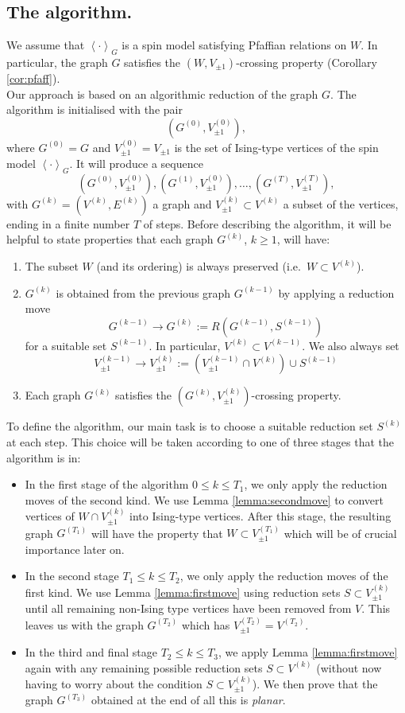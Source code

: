 \documentclass{article}
\numberwithin{equation}{section}
\theoremstyle{definition}
\theoremstyle{definition}
\theoremstyle{remark}
\newcommand{\Vis}{V_{\mathrm{Ising}}}
\renewcommand{\Vis}{V_{\pm 1}}
\renewcommand{\k}[1]{{#1}^{(k)}}
\begin{document}
\subsection{The algorithm. }
We assume that $\left< \cdot \right>_{G}$ is a spin model satisfying Pfaffian relations on $W$. In particular, the graph $G$ satisfies the $(W,\Vis)$-crossing property (Corollary \ref{cor:pfaff}).
\\[1em]
\noindent Our approach is based on an algorithmic reduction of the graph $G$. 
The algorithm is initialised with the pair
\[
	(G^{(0)},\Vis^{(0)}),
\]
where $G^{(0)} = G$ and $\Vis^{(0)} = \Vis$ is the set of Ising-type vertices of the spin model $\left< \cdot \right>_{G}$. 
It will produce a sequence
\[
	(G^{(0)},\Vis^{(0)}),(G^{(1)},\Vis^{(0)}), \ldots, (G^{(T)},\Vis^{(T)}),
\]
with $\k{G} = (\k{V},\k{E})$ a graph and $\Vis^{(k)} \subset \k{V}$ a subset of the vertices, ending in a finite number $T$ of steps. Before describing the algorithm, it will be helpful to state properties that each graph $G^{(k)}$, $k \geq 1$, will have:
\begin{enumerate}[(1)]
	\item The subset $W$ (and its ordering) is always preserved (i.e.~$W \subset V^{(k)}$). 
	\item $\k{G}$ is obtained from the previous graph $G^{(k-1)}$ by applying a reduction move
		\[
			G^{(k-1)} \longrightarrow \k{G} := R(G^{(k-1)},S^{(k-1)})
		\] 
		for a suitable set $S^{(k-1)}$. 
		In particular, $\k{V} \subset V^{(k-1)}$. 
		We also always set 
		\[
			\Vis^{(k-1)} \longrightarrow \Vis^{(k)} := (\Vis^{(k-1)} \cap \k{V}) \cup S^{(k-1)}
		\] 
	\item Each graph $G^{(k)}$ satisfies the $(\k{G},\Vis^{(k)})$-crossing property.
\end{enumerate}
To define the algorithm, our main task is to choose a suitable reduction set $S^{(k)}$ at each step. This choice will be taken according to one of three stages that the algorithm is in:
\begin{itemize}
	\item In the first stage of the algorithm $0 \leq k \leq T_1$, we only apply the reduction moves of the second kind. We use Lemma \ref{lemma:secondmove} to convert vertices of $W \cap \Vis^{(k)}$ into Ising-type vertices. After this stage, the resulting graph $G^{(T_1)}$ will have the property that $W \subset \Vis^{(T_1)}$ which will be of crucial importance later on. 

	\item In the second stage $T_1 \leq k \leq T_2$, we only apply the reduction moves of the first kind. We use Lemma \ref{lemma:firstmove} using reduction sets $S \subset \Vis^{(k)}$ until all remaining non-Ising type vertices have been removed from $V$. This leaves us with the graph $G^{(T_2)}$ which has $\Vis^{(T_2)} = V^{(T_2)}$.

	\item  In the third and final stage $T_2 \leq k \leq T_3$, we apply Lemma \ref{lemma:firstmove} again with any remaining possible reduction sets $S \subset \k{V}$ (without now having to worry about the condition $S \subset \Vis^{(k)}$). We then prove that the graph $G^{(T_3)}$ obtained at the end of all this is \emph{planar}.
\end{itemize}
\end{document}
